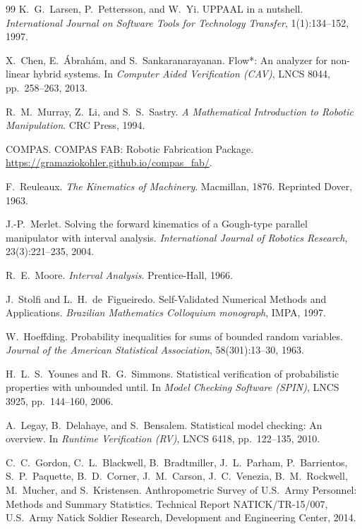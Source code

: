 \documentclass[11pt,letterpaper]{article}
\begin{document}
\begin{thebibliography}{99}
K.~G.~Larsen, P.~Pettersson, and W.~Yi.
\newblock UPPAAL in a nutshell.
\newblock \emph{International Journal on Software Tools for Technology Transfer}, 1(1):134--152, 1997.

X.~Chen, E.~{\'A}brah{\'a}m, and S.~Sankaranarayanan.
\newblock Flow*: An analyzer for non-linear hybrid systems.
\newblock In \emph{Computer Aided Verification (CAV)}, LNCS 8044, pp.~258--263, 2013.

R.~M.~Murray, Z.~Li, and S.~S.~Sastry.
\newblock \emph{A Mathematical Introduction to Robotic Manipulation}.
\newblock CRC Press, 1994.

COMPAS.
\newblock COMPAS FAB: Robotic Fabrication Package.
\newblock \url{https://gramaziokohler.github.io/compas_fab/}.

F.~Reuleaux.
\newblock \emph{The Kinematics of Machinery}.
\newblock Macmillan, 1876. Reprinted Dover, 1963.

J.-P.~Merlet.
\newblock Solving the forward kinematics of a Gough-type parallel manipulator with interval analysis.
\newblock \emph{International Journal of Robotics Research}, 23(3):221--235, 2004.

R.~E.~Moore.
\newblock \emph{Interval Analysis}.
\newblock Prentice-Hall, 1966.

J.~Stolfi and L.~H.~de~Figueiredo.
\newblock Self-Validated Numerical Methods and Applications.
\newblock \emph{Brazilian Mathematics Colloquium monograph}, IMPA, 1997.

W.~Hoeffding.
\newblock Probability inequalities for sums of bounded random variables.
\newblock \emph{Journal of the American Statistical Association}, 58(301):13--30, 1963.

H.~L.~S.~Younes and R.~G.~Simmons.
\newblock Statistical verification of probabilistic properties with unbounded until.
\newblock In \emph{Model Checking Software (SPIN)}, LNCS 3925, pp.~144--160, 2006.

A.~Legay, B.~Delahaye, and S.~Bensalem.
\newblock Statistical model checking: An overview.
\newblock In \emph{Runtime Verification (RV)}, LNCS 6418, pp.~122--135, 2010.

C.~C.~Gordon, C.~L.~Blackwell, B.~Bradtmiller, J.~L.~Parham, P.~Barrientos, S.~P.~Paquette, B.~D.~Corner, J.~M.~Carson, J.~C.~Venezia, B.~M.~Rockwell, M.~Mucher, and S.~Kristensen.
 Anthropometric Survey of U.S.~Army Personnel: Methods and Summary Statistics.
\newblock Technical Report NATICK/TR-15/007, U.S.~Army Natick Soldier Research, Development and Engineering Center, 2014.


\end{thebibliography}
\end{document}
